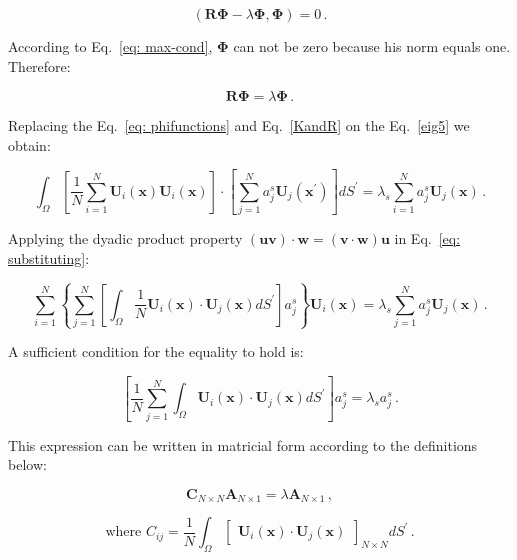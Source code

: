 \documentclass[10pt,fleqn,a4paper]{article}
\newcommand{\bv}[1]{\mathbf{#1}}
\newcommand{\xp}{x^{\mathbf{\prime}}}
\begin{document}
\begin{equation}\label{eig4}
 \left(\bv{R} \bv{\Phi} - \lambda \bv{\Phi}, \bv{\Phi} \right) = 0 \,.
\end{equation}


According to Eq.~\eqref{eq: max-cond}, $\bv{\Phi}$ can not be zero because his norm equals one. Therefore:

\begin{equation}\label{eig5}
 \bv{R} \bv{\Phi} = \lambda \bv{\Phi} \,.
\end{equation}


Replacing the Eq.~\eqref{eq: phifunctions} and Eq.~\eqref{KandR} on the Eq.~\eqref{eig5} we obtain:


\begin{equation} \label{eq: substituting} 
\int_{\Omega}  \left[\frac{1}{N} \sum_{i=1}^{N} \bv{U}_i(\bv{x})\bv{U}_i(\bv{x}) \right] \cdot \left[\sum_{j=1}^{N} a^{s}_{j} \bv{U}_{j}(\bv{\xp}) \right] dS^{\prime} = \lambda_{s} \sum_{i=1}^{N} a^{s}_{j} \bv{U}_{j} (\bv{x}) \,.
\end{equation}


Applying the dyadic product property $(\mathbf{u} \mathbf{v}) \cdot \mathbf{w} =  (\mathbf{v} \cdot \mathbf{w}) \mathbf{u}$ in Eq.~\eqref{eq: substituting}:


\begin{equation*}
\sum_{i=1}^{N} \left \lbrace \sum_{j=1}^{N} \left[\int_{\Omega} \frac{1}{N} \bv{U}_i(\bv{x}) \cdot \bv{U}_{j} (\bv{x}) dS^{\prime}  \right] a^{s}_{j} \right \rbrace \bv{U}_i(\bv{x}) = \lambda_{s} \sum_{j=1}^{N} a^{s}_{j} \bv{U}_{j} (\bv{x}) \,.
\end{equation*}


A sufficient condition for the equality to hold is:


\begin{equation}
\left[\frac{1}{N} \sum_{j=1}^{N} \int_{\Omega} \bv{U}_{i}(\bv{x}) \cdot \bv{U}_{j}(\bv{x}) dS^{\prime} \right] a^{s}_{j}= \lambda_{s} a^{s}_{j} \,.
\end{equation}


This expression can be written in matricial form according to the definitions below:


\begin{equation} \label{cov1}
\bv{C}_{N \times N} \bv{A}_{N \times 1} = \lambda \bv{A}_{N \times 1} \,,
\end{equation}


\begin{equation*}
\text{where} \, \, C_{ij}= \frac{1}{N}  \int_{\Omega} \begin{bmatrix}  \bv{U}_i(\bv{x}) \cdot \bv{U}_{j} (\bv{x})  \end{bmatrix}_{N \times N} dS^{\prime} \,.
\end{equation*}
\end{document}
